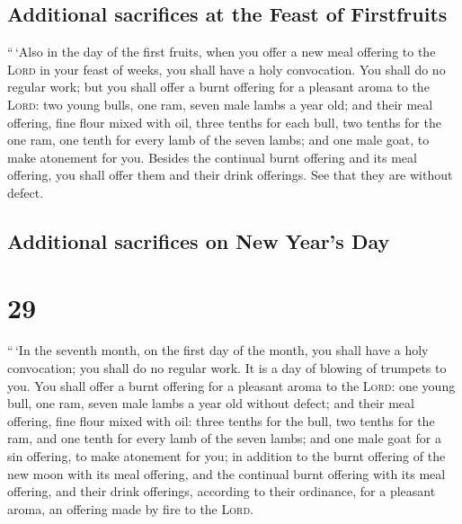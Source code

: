 \hypertarget{additional-sacrifices-at-the-feast-of-firstfruits}{%
\subsection{Additional sacrifices at the Feast of
Firstfruits}\label{additional-sacrifices-at-the-feast-of-firstfruits}}

 ``\,`Also in the day of the first fruits, when you offer
a new meal offering to the \textsc{Lord} in your feast of weeks, you
shall have a holy convocation. You shall do no regular work;
 but you shall offer a burnt offering for a pleasant
aroma to the \textsc{Lord}: two young bulls, one ram, seven male lambs a
year old;  and their meal offering, fine flour mixed with
oil, three tenths for each bull, two tenths for the one ram,
 one tenth for every lamb of the seven lambs;
 and one male goat, to make atonement for you.
 Besides the continual burnt offering and its meal
offering, you shall offer them and their drink offerings. See that they
are without defect.

\hypertarget{additional-sacrifices-on-new-years-day}{%
\subsection{Additional sacrifices on New Year's
Day}\label{additional-sacrifices-on-new-years-day}}

\hypertarget{section-28}{%
\section{29}\label{section-28}}

 ``\,`In the seventh month, on the first day of the month,
you shall have a holy convocation; you shall do no regular work. It is a
day of blowing of trumpets to you.  You shall offer a
burnt offering for a pleasant aroma to the \textsc{Lord}: one young
bull, one ram, seven male lambs a year old without defect;
 and their meal offering, fine flour mixed with oil: three
tenths for the bull, two tenths for the ram,  and one
tenth for every lamb of the seven lambs;  and one male
goat for a sin offering, to make atonement for you;  in
addition to the burnt offering of the new moon with its meal offering,
and the continual burnt offering with its meal offering, and their drink
offerings, according to their ordinance, for a pleasant aroma, an
offering made by fire to the \textsc{Lord}.

